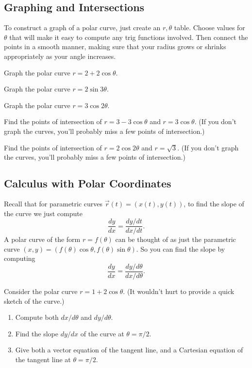 \subsection{Graphing and Intersections}
To construct a graph of a polar curve, just create an $r,\theta$ table. Choose values for $\theta$ that will make it easy to compute any trig functions involved. Then connect the points in a smooth manner, making sure that your radius grows or shrinks appropriately as your angle increases.  

\begin{problem} 
Graph the polar curve $r=2+2\cos\theta$.
\end{problem}

\begin{problem}
Graph the polar curve $r=2\sin 3\theta$.
\end{problem}

\begin{problem}
Graph the polar curve $r=3\cos 2\theta$.
\end{problem}


\begin{problem}
Find the points of intersection of $r=3-3\cos\theta$ and $r=3\cos\theta$. (If you don't graph the curves, you'll probably miss a few points of intersection.)
\end{problem}

\begin{problem}
Find the points of intersection of $r=2\cos 2\theta $ and $r=\sqrt 3$. (If you don't graph the curves, you'll probably miss a few points of intersection.)
\end{problem}


\subsection{Calculus with Polar Coordinates}

Recall that for parametric curves $\vec r(t) = (x(t),y(t))$, to find the slope of the curve we just compute $$\frac{dy}{dx}=\frac{dy/dt}{dx/dt}.$$ A polar curve of the form $r=f(\theta)$ can be thought of as just the parametric curve $(x,y) = (f(\theta)\cos\theta,f(\theta)\sin\theta)$. So you can find the slope by computing
$$\frac{dy}{dx}=\frac{dy/d\theta}{dx/d\theta}.$$

\begin{problem}
Consider the polar curve $r=1+2\cos \theta$. (It wouldn't hurt to provide a quick sketch of the curve.)
\begin{enumerate}
\item Compute both $dx/d\theta$ and $dy/d\theta$.
\item Find the slope $dy/dx$ of the curve at $\theta=\pi/2$.
\item Give both a vector equation of the tangent line, and a Cartesian equation of the tangent line at $\theta=\pi/2$.
\end{enumerate}
\end{problem}

